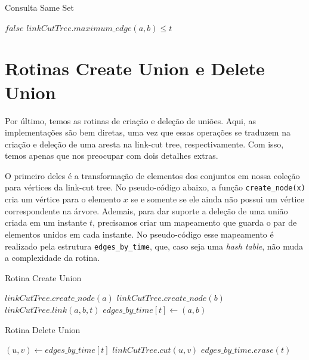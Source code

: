 \begin{algorithm}[h!]
    \caption{Consulta Same Set}\label{uf:same-set}
    \begin{algorithmic}
        \State \Return $false$
        \EndIf
        \State \Return $linkCutTree.maximum\_edge(a, b) \leq t$
        \EndFunction
    \end{algorithmic}
\end{algorithm}

\section{Rotinas Create Union e Delete Union}
\label{sec:uf-union}

Por último, temos as rotinas de criação e deleção de uniões. Aqui, as implementações são bem diretas, uma vez que essas operações se traduzem na criação e deleção de uma aresta na link-cut tree, respectivamente. Com isso, temos apenas que nos preocupar com dois detalhes extras.

O primeiro deles é a transformação de elementos dos conjuntos em nossa coleção para vértices da link-cut tree. No pseudo-código abaixo, a função \texttt{create\_node(x)} cria um vértice para o elemento $x$ se e somente se ele ainda não possui um vértice correspondente na árvore. Ademais, para dar suporte a deleção de uma união criada em um instante $t$, precisamos criar um mapeamento que guarda o par de elementos unidos em cada instante. No pseudo-código esse mapeamento é realizado pela estrutura \texttt{edges\_by\_time}, que, caso seja uma \emph{hash table}, não muda a complexidade da rotina.

\begin{algorithm}[h!]
    \caption{Rotina Create Union}\label{uf:create-union}
    \begin{algorithmic}
        \State $linkCutTree.create\_node(a)$
        \State $linkCutTree.create\_node(b)$
        \State $linkCutTree.link(a,b,t)$
        \State $edges\_by\_time[t] \gets (a, b)$
        \EndFunction
    \end{algorithmic}
\end{algorithm}

\begin{algorithm}[h!]
    \caption{Rotina Delete Union}\label{uf:delete-union}
    \begin{algorithmic}
        \State $(u,v) \gets edges\_by\_time[t]$
        \State $linkCutTree.cut(u,v)$
        \State $edges\_by\_time.erase(t)$
        \EndFunction
    \end{algorithmic}
\end{algorithm}
